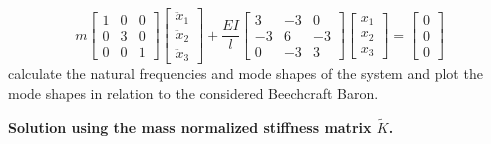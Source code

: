 \documentclass[12pt,letter]{article}
\begin{document}
\begin{example}
	\begin{equation}
		  m\begin{bmatrix} 1 & 0 & 0 \\    0  & 3 & 0 \\ 0  & 0 & 1 \end{bmatrix} \begin{bmatrix} \ddot{x}_1 \\    \ddot{x}_2 \\    \ddot{x}_3  \end{bmatrix} + \frac{EI}{l} \begin{bmatrix} 3 & -3 & 0 \\  -3  & 6 & -3 \\  0  & -3 & 3 \end{bmatrix} \begin{bmatrix} x_1 \\    x_2 \\    x_3 \end{bmatrix} = \begin{bmatrix} 0 \\  0 \\ 0 \end{bmatrix} 
	\end{equation}
	calculate the natural frequencies and mode shapes of the system and plot the mode shapes in relation to the considered Beechcraft Baron.
	
	\vspace{2ex}
	\noindent \textbf{Solution using the mass normalized stiffness matrix $\tilde{K}$.}
	\vspace{1ex}
	

\end{example}
\end{document}
